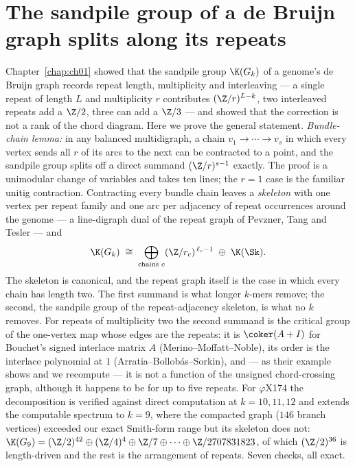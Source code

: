 \chapter[The sandpile group splits along the repeats]{The sandpile group of a de Bruijn graph splits along its repeats}\label{chap:ch03}
\begin{chaptersummary}
Chapter~\ref{chap:ch01} showed that the sandpile group $\K(G_k)$ of a genome's de Bruijn
graph records repeat length, multiplicity and interleaving --- a single repeat of length
$L$ and multiplicity $r$ contributes $(\Z/r)^{L-k}$, two interleaved repeats add a $\Z/2$,
three can add a $\Z/3$ --- and showed that the correction is not a rank of the chord
diagram. Here we prove the general statement. \emph{Bundle-chain lemma:} in
any balanced multidigraph, a chain $v_1\to\cdots\to v_s$ in which every vertex sends all
$r$ of its arcs to the next can be contracted to a point, and the sandpile group splits
off a direct summand $(\Z/r)^{s-1}$ exactly. The proof is a unimodular change of
variables and takes ten lines; the $r=1$ case is the familiar unitig contraction.
Contracting every bundle chain leaves a \emph{skeleton} with one vertex per repeat family
and one arc per adjacency of repeat occurrences around the genome --- a line-digraph
dual of the repeat graph of Pevzner, Tang and Tesler --- and
\[
\K(G_k)\;\cong\;\bigoplus_{\text{chains }c}(\Z/r_c)^{\,\ell_c-1}\;\oplus\;\K(\Sk).
\]
The skeleton is canonical, and the repeat graph itself is the case in which every chain
has length two. The first summand is what longer $k$-mers remove; the second, the
sandpile group of the repeat-adjacency skeleton, is what no $k$ removes. For repeats of
multiplicity two the second summand is the critical group of the one-vertex map whose
edges are the repeats: it is $\coker(A+I)$ for Bouchet's signed interlace matrix $A$
(Merino--Moffatt--Noble), its order is the interlace polynomial at $1$
(Arratia--Bollob\'as--Sorkin), and --- as their example shows and we recompute --- it is
not a function of the unsigned chord-crossing graph, although it happens to be for up to
five repeats. For $\varphi$X174 the decomposition is
verified against direct computation at $k=10,11,12$ and extends the computable spectrum
to $k=9$, where the compacted graph ($146$ branch vertices) exceeded our exact Smith-form
range but its skeleton does not: $\K(G_9)=(\Z/2)^{42}\oplus(\Z/4)^{4}\oplus\Z/7\oplus
\cdots\oplus\Z/2707831823$, of which $(\Z/2)^{36}$ is length-driven and the rest is the
arrangement of repeats. Seven checks, all exact.
\end{chaptersummary}

